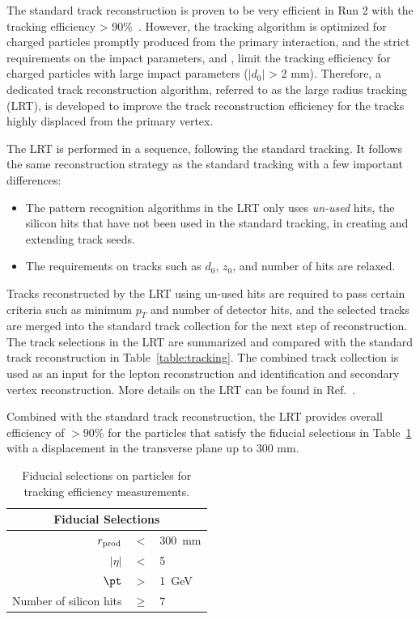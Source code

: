 The standard track reconstruction is proven to be very efficient in Run 2 with the tracking efficiency > 90\%~\cite{Aaboud:2017all}. However, the tracking algorithm is optimized for charged particles promptly produced from the primary interaction, and the strict requirements on the impact parameters, \dzero and \zzero, limit the tracking efficiency for charged particles with large impact parameters ($|d_{0}|$ > 2 mm). Therefore, a dedicated track reconstruction algorithm, referred to as the large radius tracking (LRT), is developed to improve the track reconstruction efficiency for the tracks highly displaced from the primary vertex.

The LRT is performed in a sequence, following the standard tracking. It follows the same reconstruction strategy as the standard tracking with a few important differences:

\begin{itemize}
	\item The pattern recognition algorithms in the LRT only uses \textit{un-used} hits, the silicon hits that have not been used in the standard tracking, in creating and extending track seeds.
	\item The requirements on tracks such as $d_{0}$, $z_{0}$, and number of hits are relaxed.
\end{itemize}

Tracks reconstructed by the LRT using un-used hits are required to pass certain criteria such as minimum $p_{T}$ and number of detector hits, and the selected tracks are merged into the standard track collection for the next step of reconstruction. The track selections in the LRT are summarized and compared with the standard track reconstruction in Table~\ref{table:tracking}. The combined track collection is used as an input for the lepton reconstruction and identification and secondary vertex reconstruction. More details on the LRT can be found in Ref.~\cite{ATL-PHYS-PUB-2017-014}.

Combined with the standard track reconstruction, the LRT provides overall efficiency of $> 90\%$ for the particles that satisfy the fiducial selections in Table~\ref{table:TechEffTable} with a displacement in the transverse plane up to 300 \si{\milli\meter}.

\begin{table}[!htb]
\centering
\begin{tabular}{ r c l }
 \hline
 \hline
  \multicolumn{3}{c}{Fiducial Selections}  \\
 \hline
 $r_{\rm prod}$ & $<$ & 300~mm \\
$|\eta|$ & $<$ & 5 \\
 $\pt$ & $>$ & 1~GeV  \\
 Number of silicon hits & $\ge$ & 7  \\
\hline
\hline
\end{tabular}
\caption{Fiducial selections on particles for tracking efficiency measurements.}
\label{table:TechEffTable}
\end{table}


